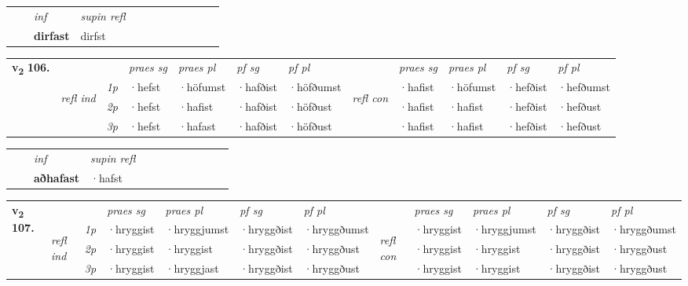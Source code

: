 \begin{tabular}{llllllllllll}
 & & \textit{inf}       & \textit{supin refl}      \\*
  & & \textbf{dirfast}        & dirfst  \\*
\cmidrule{1-12}
\end{tabular}



\begin{tabular}{llllllllllll} \toprule
\multirow{4}{*}{{{\textbf{v{\textsubscript{2}}} \Large{\textbf{106.}}}}}  & &   &  \textit{praes sg}  & \textit{praes pl}  &\textit{pf sg} & \textit{pf pl} &  &  \textit{praes sg}  & \textit{praes pl}  & \textit{pf sg} & \textit{pf pl } \\*
	\cmidrule{4-7} \cmidrule{9-12}
 &\multirow{3}{*}{\begin{turn}{90}\textit{refl ind}\end{turn}} & {\textit{1p}} & ·hefst & ·höfumst    & ·hafðist & ·höfðumst & \multirow{3}{*}{\begin{turn}{90}\textit{refl con}\end{turn}}  &·hafist & ·höfumst & ·hefðist & ·hefðumst\\*
 &&  {\textit{2p}} &  ·hefst  & ·hafist   & ·hafðist & ·höfðust & &·hafist & ·hafist & ·hefðist & ·hefðust \\*
& &  {\textit{3p}} & ·hefst & ·hafast   & ·hafðist & ·höfðust & & ·hafist & ·hafist& ·hefðist & ·hefðust  \\*
\cmidrule{4-7} \cmidrule{9-12}
\end{tabular}


\begin{tabular}{llllllllllll}
 & & \textit{inf}       & \textit{supin refl}      \\*
  & & \textbf{aðhafast}        & ·hafst  \\*
\cmidrule{1-12}
\end{tabular}



\begin{tabular}{llllllllllll} \toprule
\multirow{4}{*}{{{\textbf{v{\textsubscript{2}}} \Large{\textbf{107.}}}}}  & &   &  \textit{praes sg}  & \textit{praes pl}  &\textit{pf sg} & \textit{pf pl} &  &  \textit{praes sg}  & \textit{praes pl}  & \textit{pf sg} & \textit{pf pl } \\*
	\cmidrule{4-7} \cmidrule{9-12}
 &\multirow{3}{*}{\begin{turn}{90}\textit{refl ind}\end{turn}} & {\textit{1p}} & ·hryggist & ·hryggjumst    & ·hryggðist & ·hryggðumst & \multirow{3}{*}{\begin{turn}{90}\textit{refl con}\end{turn}}  &·hryggist & ·hryggjumst & ·hryggðist & ·hryggðumst\\*
 &&  {\textit{2p}} &  ·hryggist  & ·hryggist   & ·hryggðist & ·hryggðust & &·hryggist & ·hryggist & ·hryggðist & ·hryggðust \\*
& &  {\textit{3p}} & ·hryggist & ·hryggjast   & ·hryggðist & ·hryggðust & & ·hryggist & ·hryggist& ·hryggðist & ·hryggðust  \\*
\cmidrule{4-7} \cmidrule{9-12}
\end{tabular}


